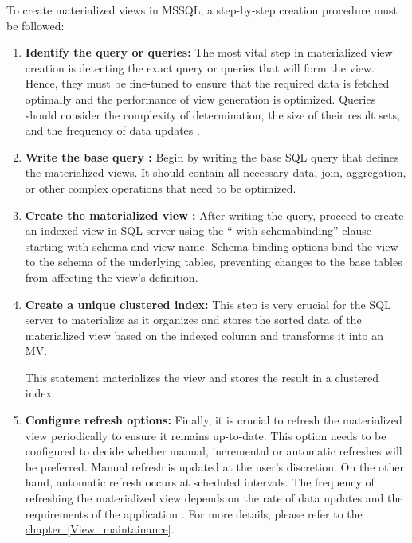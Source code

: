  To create materialized views in MSSQL, a step-by-step creation procedure must be followed:
 \begin{enumerate}
     

     \item\textbf{Identify the query or queries:} The most vital step in materialized view creation is detecting the exact query or queries that will form the view. Hence, they must be fine-tuned to ensure that the required data is fetched optimally and the performance of view generation is optimized. Queries should consider the complexity of determination, the size of their result sets, and the frequency of data updates \cite{castordoc2023}.
     
      \item\textbf{ Write the base query :} Begin by writing the base  SQL query that defines the materialized views. It should contain all necessary data, join, aggregation, or other complex operations that need to be optimized. \vspace{0.4cm}
      
      
      \item\textbf{ Create the materialized view :} After writing the query, proceed to create an indexed view in SQL server using the `` with schemabinding'' clause starting with schema and view name. Schema binding options bind the view to the schema of the underlying tables, preventing changes to the base tables from affecting the view's definition. %

      

      \item\textbf{ Create a unique clustered index:} This step is very crucial for the SQL server to materialize as it organizes and stores the sorted data of the materialized view based on the indexed column and transforms it into an MV. \vspace{0.4cm}
      
       

This statement materializes the view and stores the result in a clustered index.
      
      \item\textbf{ Configure refresh options:} Finally, it is crucial to refresh the materialized view periodically to ensure it remains up-to-date. This option needs to be configured to decide whether manual, incremental or automatic refreshes will be preferred. Manual refresh is updated at the user's discretion. On the other hand, automatic refresh occurs at scheduled intervals. The frequency of refreshing the materialized view depends on the rate of data updates and the requirements of the application \cite{castordoc2023}. For more details, please refer to the \hyperref[View_maintainance]{chapter~\ref*{View_maintainance}}.\vspace{0.4cm}
      

\end{enumerate}
